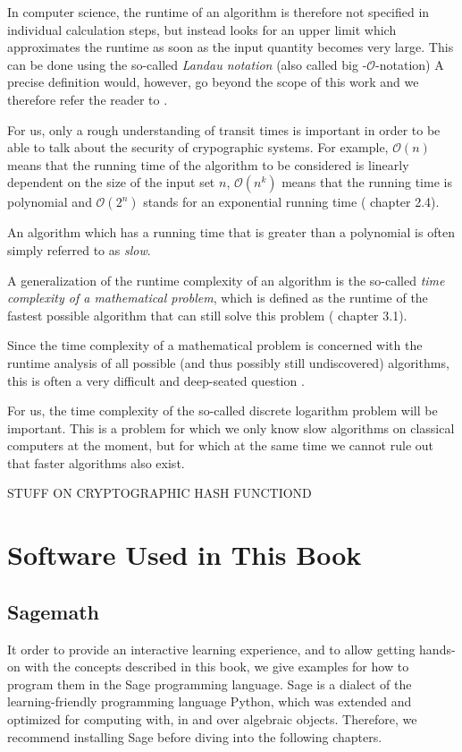 In computer science, the runtime of an algorithm is therefore not specified in individual calculation steps, but instead looks for an upper limit which approximates the runtime as soon as the input quantity becomes very large. This can be done using the so-called \textit{Landau notation} (also called big -$\mathcal{O}$-notation) A precise definition
would, however, go beyond the scope of this work and we therefore refer the reader to 
.

For us, only a rough understanding of transit times is important in order to be able to talk about the security of crypographic systems. For example, $\mathcal{O}(n)$ means that the running time of the algorithm to be considered is linearly dependent on the size of the input set $n$, $\mathcal{O}(n^k)$ means that the running time is polynomial and $\mathcal{O}(2^n) $ stands for an exponential running time (%
chapter 2.4).


An algorithm which has a running time that is greater than a polynomial is often simply referred to as \textit{slow}.

A generalization of the runtime complexity of an algorithm is the so-called \textit{time complexity of a mathematical problem}, which is defined as the runtime of the fastest possible algorithm that can still solve this problem (
chapter 3.1).

Since the time complexity of a mathematical problem is concerned with the runtime analysis of all possible (and thus possibly still undiscovered) algorithms, this is often a very difficult and deep-seated question .

For us, the time complexity of the so-called discrete logarithm problem will be important. This is a problem for which we only know slow algorithms on classical computers at the moment, but for which at the same time we cannot rule out that faster algorithms also exist.
 

STUFF ON CRYPTOGRAPHIC HASH FUNCTIOND


\section{Software Used in This Book}

\subsection{Sagemath}
\label{sagemath_setup}
It order to provide an interactive learning experience, and to allow getting hands-on with the concepts described in this book, we give examples for how to program them in the Sage programming language. Sage is a dialect of the learning-friendly programming language Python, which was extended and optimized for computing with, in and over algebraic objects. Therefore, we recommend installing Sage before diving into the following chapters.

